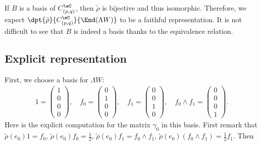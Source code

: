 If $B$ is a basis of $C^{\eC}_{(p,q)}$, then $\tilde\rho$ is bijective and thus isomorphic.  Therefore, we expect $\dpt{\tilde\rho}{C^{\eC}_{(p,q)}}{\End(\Lambda W)}$ to be a faithful representation. It is not difficult to see that $B$ is indeed a basis thanks to the equivalence relation.

\subsection{Explicit representation}

First, we choose a basis for $\Lambda W$:
\begin{eqnarray}\label{102r2} 1=\left(\begin{matrix}
			1 \\
			0 \\
			0 \\
			0
		\end{matrix}\right),\quad
	f_0=\left(\begin{matrix}
			0 \\
			1 \\
			0 \\
			0
		\end{matrix}\right),\quad
	f_1=\left(\begin{matrix}
			0 \\
			0 \\
			1 \\
			0
		\end{matrix}\right),\quad
	f_0\wedge f_1=\left(\begin{matrix}
			0 \\
			0 \\
			0 \\
			1
		\end{matrix}\right).
\end{eqnarray}
Here is the explicit computation for the matrix $\gamma_0$ in this basis. First remark that $\tilde\rho(e_0)1=f_0$, $\tilde\rho(e_0)f_0=\frac{1}{2}$, $\tilde\rho(e_0)f_1=f_0\wedge f_1$, $\tilde\rho(e_0)(f_0\wedge f_1)=\frac{1}{2} f_1$. Then
